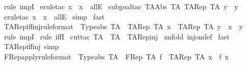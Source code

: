 \begin{isabellebody}
\isamarkupfalse%
\ {\isacharparenleft}rule\ impI{\isacharparenright}\isanewline
{}\isamarkupfalse%
\ {\isacharparenleft}erule{\isacharunderscore}tac\ x\ {\isacharequal}\ {\isachardoublequoteopen}x{\isachardoublequoteclose}\ \ allE{\isacharparenright}\isanewline
{}\isamarkupfalse%
\ {\isacharparenleft}subgoal{\isacharunderscore}tac\ {\isachardoublequoteopen}TAAbs\ TA\ {\isacharparenleft}TARep\ TA\ y{\isacharparenright}\ {\isacharequal}\ y{\isachardoublequoteclose}{\isacharparenright}\isanewline
{}\isamarkupfalse%
\ {\isacharparenleft}erule{\isacharunderscore}tac\ x\ {\isacharequal}\ {\isachardoublequoteopen}x{\isachardoublequoteclose}\ \ allE{\isacharparenright}\isanewline
{}\isamarkupfalse%
\ simp\isanewline
{}\isamarkupfalse%
\ fast\isanewline
{}\isamarkupfalse%
%
\endisatagproof
{\isafoldproof}%
%
\isadelimproof
\isanewline
%
\endisadelimproof
\isanewline
{}\isamarkupfalse%
\ TARep{\isacharunderscore}iff{\isacharunderscore}inj{\isacharbrackleft}rule{\isacharunderscore}format{\isacharbrackright}\ {\isacharcolon}\ {\isachardoublequoteopen}Typeabs\ TA\ {\isacharminus}{\isacharminus}{\isachargreater}\ {\isacharparenleft}{\isacharparenleft}TARep\ TA\ x{\isacharparenright}\ {\isacharequal}\ {\isacharparenleft}TARep\ TA\ y{\isacharparenright}{\isacharparenright}\ {\isacharequal}\ {\isacharparenleft}x\ {\isacharequal}\ y{\isacharparenright}{\isachardoublequoteclose}\isanewline
%
\isadelimproof
%
\endisadelimproof
%
\isatagproof
{}\isamarkupfalse%
\ {\isacharparenleft}rule\ impI{\isacharparenright}\isanewline
{}\isamarkupfalse%
\ {\isacharparenleft}rule\ iffI{\isacharparenright}\isanewline
{}\isamarkupfalse%
\ {\isacharparenleft}cut{\isacharunderscore}tac\ TA\ {\isacharequal}\ {\isachardoublequoteopen}TA{\isachardoublequoteclose}\ \ TARep{\isacharunderscore}inj{\isacharparenright}\isanewline
{}\isamarkupfalse%
\ {\isacharparenleft}unfold\ inj{\isacharunderscore}on{\isacharunderscore}def{\isacharparenright}\isanewline
{}\isamarkupfalse%
\ fast{\isacharplus}\ \isanewline
{}\isamarkupfalse%
%
\endisatagproof
{\isafoldproof}%
%
\isadelimproof
\isanewline
%
\endisadelimproof
\isanewline
{}\isamarkupfalse%
\ TARep{\isacharunderscore}iff{\isacharunderscore}inj\ {\isacharbrackleft}simp{\isacharbrackright}\isanewline
\isanewline
{}\isamarkupfalse%
\ FRep{\isacharunderscore}apply{\isacharbrackleft}rule{\isacharunderscore}format{\isacharbrackright}\ {\isacharcolon}\ {\isachardoublequoteopen}Typeabs\ TA\ {\isacharminus}{\isacharminus}{\isachargreater}\ {\isacharparenleft}{\isacharparenleft}FRep\ TA\ f{\isacharparenright}\ {\isacharpercent}{\isacharcircum}\ {\isacharparenleft}TARep\ TA\ x{\isacharparenright}{\isacharparenright}\ {\isacharequal}\ {\isacharparenleft}f\ x{\isacharparenright}{\isachardoublequoteclose}\isanewline

\end{isabellebody}
